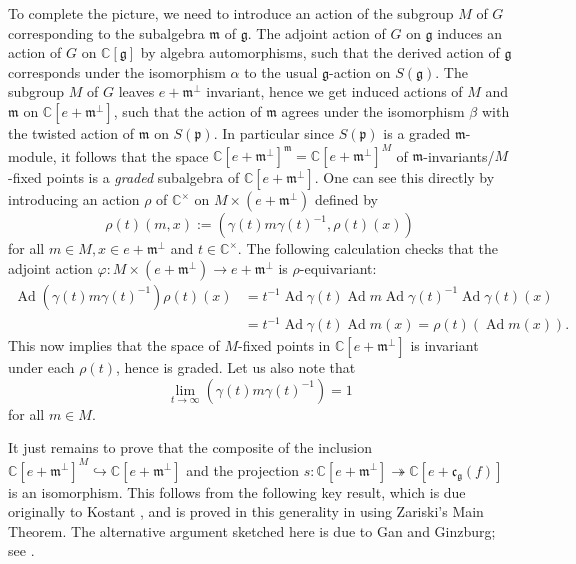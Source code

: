 \documentclass[twoside,12pt,reqno]{amsart}
\def\Ad{\operatorname{Ad}}
\def\C{{\mathbb C}}
\begin{document}
To complete the picture,
we need to introduce an action of the subgroup $M$ of $G$
corresponding to the subalgebra $\mathfrak{m}$ of $\mathfrak{g}$.
The adjoint action of $G$ on $\mathfrak{g}$
induces an action of $G$ on $\C[\mathfrak{g}]$
by algebra automorphisms, such that the derived action 
of $\mathfrak{g}$
corresponds under the isomorphism $\alpha$ to the
usual $\mathfrak{g}$-action on $S(\mathfrak{g})$.
The subgroup $M$ of $G$ leaves 
$e+\mathfrak{m}^\perp$ invariant, hence we get induced
actions of $M$ and $\mathfrak{m}$ on $\C[e+\mathfrak{m}^\perp]$,
such that
the action of $\mathfrak{m}$
agrees under the isomorphism $\beta$ with the
twisted action of $\mathfrak{m}$ on $S(\mathfrak{p})$.
In particular since $S(\mathfrak{p})$
is a graded $\mathfrak{m}$-module, it follows that the
space $\C[e+\mathfrak{m}^\perp]^{\mathfrak{m}}
=\C[e+\mathfrak{m}^\perp]^M$ of $\mathfrak{m}$-invariants/$M$-fixed points
is a {\em graded} subalgebra of $\C[e+\mathfrak{m}^\perp]$.
One can see this directly by introducing an action
$\rho$ of $\C^\times$ on $M \times (e+\mathfrak{m}^\perp)$
defined by
\begin{equation}\label{rho2}
\rho(t) (m,x) := (\gamma(t) m \gamma(t)^{-1}, \rho(t)(x))
\end{equation}
for all $m \in M, x \in e+\mathfrak{m}^\perp$ and $t \in \C^\times$.
The following calculation checks that the 
adjoint action $\varphi:M \times (e+\mathfrak{m}^\perp)
\rightarrow e+\mathfrak{m}^\perp$ is $\rho$-equivariant:
\begin{align*}
\Ad (\gamma(t) m \gamma(t)^{-1}) \rho(t) (x)
&=
t^{-1} \Ad \gamma(t) \Ad m \Ad \gamma(t)^{-1} \Ad \gamma(t) (x)\\
&= 
t^{-1} \Ad \gamma(t) \Ad m (x)
=
\rho(t) (\Ad m(x)).
\end{align*}
This now 
implies that the space of $M$-fixed points in $\C[e+\mathfrak{m}^\perp]$
is invariant under each $\rho(t)$, hence is graded.
Let us also note that
\begin{equation}\label{lim2}
\lim_{t \rightarrow \infty} (\gamma(t) m \gamma(t)^{-1}) = 1
\end{equation}
for all $m \in M$.

It just remains to prove that the composite
of the inclusion
$\C[e+\mathfrak{m}^\perp]^M \hookrightarrow \C[e+\mathfrak{m}^\perp]$
and the projection $s:\C[e+\mathfrak{m}^\perp] \twoheadrightarrow
\C[e+\mathfrak{c}_{\mathfrak{g}}(f)]$ is an isomorphism.
This follows from the following key result,
which is due originally to Kostant \cite[Theorem 1.2]{K},
and is proved in this generality in \cite[Theorem 1.2]{Ly}
using Zariski's Main Theorem.
The alternative argument sketched here is due to Gan and Ginzburg; see 
\cite[Lemma 2.1]{GG}.
\end{document}
